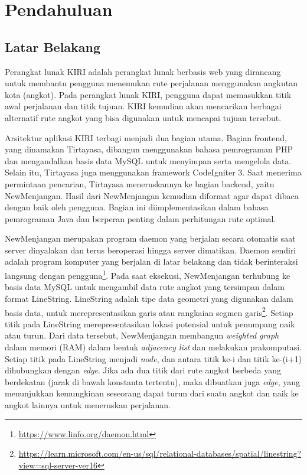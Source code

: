 \chapter{Pendahuluan}
\label{chap:intro}
   
\section{Latar Belakang}
\label{sec:label}

Perangkat lunak KIRI adalah perangkat lunak berbasis web yang dirancang untuk membantu pengguna menemukan rute perjalanan menggunakan angkutan kota (angkot). Pada perangkat lunak KIRI, pengguna dapat memasukkan titik awal perjalanan dan titik tujuan. KIRI kemudian akan mencarikan berbagai alternatif rute angkot yang bisa digunakan untuk mencapai tujuan tersebut.
	
Arsitektur aplikasi KIRI terbagi menjadi dua bagian utama. Bagian frontend, yang dinamakan Tirtayasa, dibangun menggunakan bahasa pemrograman PHP dan mengandalkan basis data MySQL untuk menyimpan serta mengelola data. Selain itu, Tirtayasa juga menggunakan framework CodeIgniter 3. Saat menerima permintaan pencarian, Tirtayasa meneruskannya ke bagian backend, yaitu NewMenjangan. Hasil dari NewMenjangan kemudian diformat agar dapat dibaca dengan baik oleh pengguna. Bagian ini diimplementasikan dalam bahasa pemrograman Java dan berperan penting dalam perhitungan rute optimal.

NewMenjangan merupakan program daemon yang berjalan secara otomatis saat server dinyalakan dan terus beroperasi hingga server dimatikan. Daemon sendiri adalah program komputer yang berjalan di latar belakang dan tidak berinteraksi langsung dengan pengguna\footnote{\url{https://www.linfo.org/daemon.html}}. Pada saat eksekusi, NewMenjangan terhubung ke basis data MySQL untuk mengambil data rute angkot yang tersimpan dalam format LineString. LineString adalah tipe data geometri yang digunakan dalam basis data, untuk merepresentasikan garis atau rangkaian segmen garis\footnote{\url{https://learn.microsoft.com/en-us/sql/relational-databases/spatial/linestring?view=sql-server-ver16}}. Setiap titik pada LineString merepresentasikan lokasi potensial untuk penumpang naik atau turun. Dari data tersebut, NewMenjangan membangun \textit{weighted graph} dalam memori (RAM) dalam bentuk \textit{adjacency list} dan melakukan prakomputasi. Setiap titik pada LineString menjadi \textit{node}, dan antara titik ke-i dan titik ke-(i+1) dihubungkan dengan \textit{edge}. Jika ada dua titik dari rute angkot berbeda yang berdekatan (jarak di bawah konstanta tertentu), maka dibuatkan juga \textit{edge}, yang menunjukkan kemungkinan seseorang dapat turun dari suatu angkot dan naik ke angkot lainnya untuk meneruskan perjalanan. 
  
